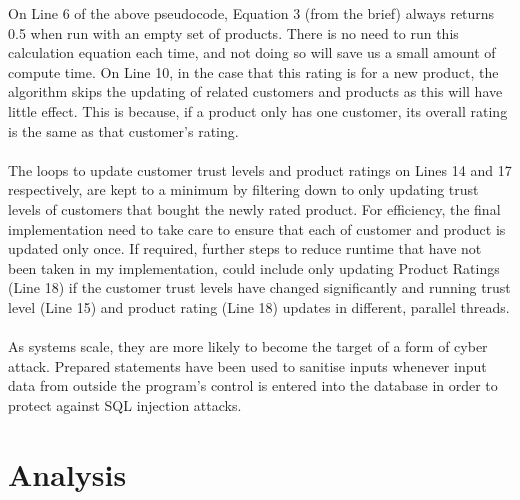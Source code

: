 \documentclass{article}
\begin{document}
On Line 6 of the above pseudocode, Equation 3 (from the brief) always returns 0.5 when run with an empty set of products. There is no need to run this calculation equation each time, and not doing so will save us a small amount of compute time. On Line 10, in the case that this rating is for a new product, the algorithm skips the updating of related customers and products as this will have little effect. This is because, if a product only has one customer, its overall rating is the same as that customer's rating.
\\\\
The loops to update customer trust levels and product ratings on Lines 14 and 17 respectively, are kept to a minimum by filtering down to only updating trust levels of customers that bought the newly rated product. For efficiency, the final implementation need to take care to ensure that each of customer and product is updated only once. If required, further steps to reduce runtime that have not been taken in my implementation, could include only updating Product Ratings (Line 18) if the customer trust levels have changed significantly and running trust level (Line 15) and product rating (Line 18) updates in different, parallel threads.
\\\\
As systems scale, they are more likely to become the target of a form of cyber attack. Prepared statements have been used to sanitise inputs whenever input data from outside the program's control is entered into the database in order to protect against SQL injection attacks.

\section{Analysis} %
\end{document}
